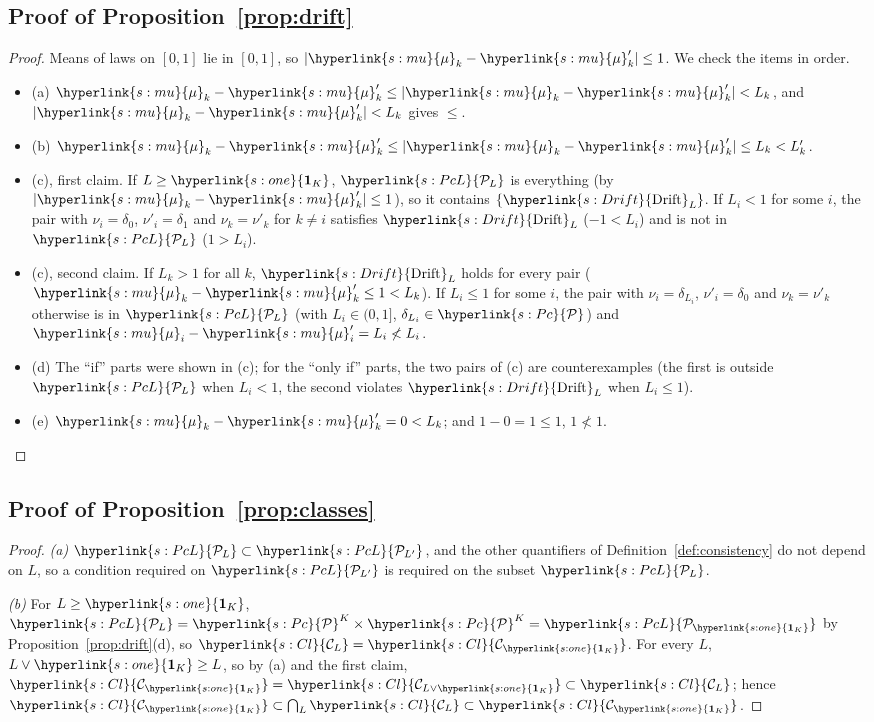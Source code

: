 \documentclass[11pt]{article}
\newcommand{\sy}[2]{\hyperlink{#1}{#2}}
\newcommand{\Pc}{\sy{s:Pc}{\mathcal{P}}}
\newcommand{\PcL}[1][L]{\sy{s:PcL}{\mathcal{P}_{#1}}}
\newcommand{\ClL}[1][L]{\sy{s:Cl}{\mathcal{C}_{#1}}}
\newcommand{\Drift}{\sy{s:Drift}{\mathrm{Drift}}}
\newcommand{\one}{\sy{s:one}{\mathbf{1}_{K}}}
\newcommand{\mean}{\sy{s:mu}{\mu}}
\begin{document}
\subsection{Proof of Proposition~\ref{prop:drift}}

\begin{proof}
Means of laws on $[0,1]$ lie in $[0,1]$, so $|\mean_k-\mean'_k|\le1$. We check the items in order.
\begin{itemize}
\item (a) $\mean_k-\mean'_k\le|\mean_k-\mean'_k|<L_k$, and $|\mean_k-\mean'_k|<L_k$ gives $\le$.
\item (b) $\mean_k-\mean'_k\le|\mean_k-\mean'_k|\le L_k<L'_k$.
\item (c), first claim. If $L\ge\one$, $\PcL$ is everything (by $|\mean_k-\mean'_k|\le1$), so it
  contains $\{\Drift_L\}$. If $L_i<1$ for some $i$, the pair with $\nu_i=\delta_0$, $\nu'_i=\delta_1$
  and $\nu_k=\nu'_k$ for $k\ne i$ satisfies $\Drift_L$ ($-1<L_i$) and is not in $\PcL$ ($1>L_i$).
\item (c), second claim. If $L_k>1$ for all $k$, $\Drift_L$ holds for every pair
  ($\mean_k-\mean'_k\le1<L_k$). If $L_i\le1$ for some $i$, the pair with $\nu_i=\delta_{L_i}$,
  $\nu'_i=\delta_0$ and $\nu_k=\nu'_k$ otherwise is in $\PcL$ (with $L_i\in(0,1]$, $\delta_{L_i}\in\Pc$)
  and $\mean_i-\mean'_i=L_i\not<L_i$.
\item (d) The ``if'' parts were shown in (c); for the ``only if'' parts, the two pairs of (c) are
  counterexamples (the first is outside $\PcL$ when $L_i<1$, the second violates $\Drift_L$ when
  $L_i\le1$).
\item (e) $\mean_k-\mean'_k=0<L_k$; and $1-0=1\le1$, $1\not<1$. \qedhere
\end{itemize}
\end{proof}

\subsection{Proof of Proposition~\ref{prop:classes}}

\begin{proof}
\emph{(a)} $\PcL\subset\PcL[L']$, and the other quantifiers of Definition~\ref{def:consistency} do
not depend on $L$, so a condition required on $\PcL[L']$ is required on the subset $\PcL$.

\emph{(b)} For $L\ge\one$, $\PcL=\Pc^K\times\Pc^K=\PcL[\one]$ by Proposition~\ref{prop:drift}(d), so
$\ClL=\ClL[\one]$. For every $L$, $L\vee\one\ge L$, so by (a) and the first claim,
$\ClL[\one]=\ClL[L\vee\one]\subset\ClL$; hence $\ClL[\one]\subset\bigcap_L\ClL\subset\ClL[\one]$.
\end{proof}
\end{document}
